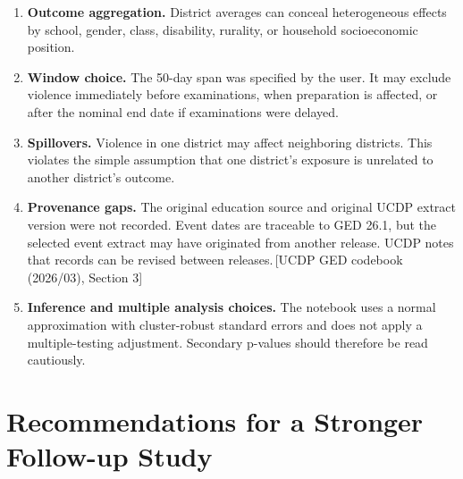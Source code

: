 \documentclass[11pt]{article}
\newcommand{\sourceref}[1]{\textcolor{black!65}{\,[#1]}}
\begin{document}
\begin{enumerate}
  \item \textbf{Outcome aggregation.} District averages can conceal heterogeneous effects by school, gender, class, disability, rurality, or household socioeconomic position.

  \item \textbf{Window choice.} The 50-day span was specified by the user. It may exclude violence immediately before examinations, when preparation is affected, or after the nominal end date if examinations were delayed.

  \item \textbf{Spillovers.} Violence in one district may affect neighboring districts. This violates the simple assumption that one district's exposure is unrelated to another district's outcome.

  \item \textbf{Provenance gaps.} The original education source and original UCDP extract version were not recorded. Event dates are traceable to GED 26.1, but the selected event extract may have originated from another release. UCDP notes that records can be revised between releases.\sourceref{UCDP GED codebook (2026/03), Section 3}

  \item \textbf{Inference and multiple analysis choices.} The notebook uses a normal approximation with cluster-robust standard errors and does not apply a multiple-testing adjustment. Secondary p-values should therefore be read cautiously.
\end{enumerate}

\section{Recommendations for a Stronger Follow-up Study}
\end{document}
